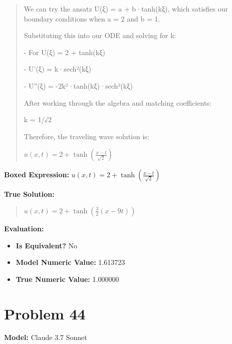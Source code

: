 \documentclass{article}
\begin{document}
\begin{quote}
We can try the ansatz U(ξ) = a + b·tanh(kξ), which satisfies our boundary conditions when a = 2 and b = 1.



Substituting this into our ODE and solving for k:

- For U(ξ) = 2 + tanh(kξ)

- U'(ξ) = k·sech²(kξ)

- U''(ξ) = -2k²·tanh(kξ)·sech²(kξ)



After working through the algebra and matching coefficients:

k = 1/√2



Therefore, the traveling wave solution is:



$\boxed{u(x,t) = 2 + \tanh\left(\frac{x-t}{\sqrt{2}}\right)}$
\end{quote}
\textbf{Boxed Expression:} $u(x,t) = 2 + \tanh\left(\frac{x-t}{\sqrt{2}}\right)$

\textbf{True Solution:}
\begin{quote}
$u(x,t) = 2+\tanh(\frac{3}{2}(x-9t))$
\end{quote}

\textbf{Evaluation:}
\begin{itemize}
\item \textbf{Is Equivalent?} No
\item \textbf{Model Numeric Value:} 1.613723
\item \textbf{True Numeric Value:} 1.000000
\end{itemize}
\vspace{1cm}
\section*{Problem 44}
\textbf{Model:} Claude 3.7 Sonnet
\end{document}
